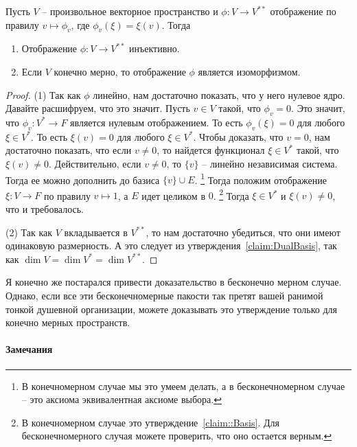 \begin{claim}
\label{claim::DoubleDuoIsom}
Пусть $V$ -- произвольное векторное пространство и $\phi\colon V\to V^{**}$ отображение по правилу $v\mapsto \phi_v$, где $\phi_v(\xi) = \xi(v)$.
Тогда 
\begin{enumerate}
\item Отображение $\phi\colon V\to V^{**}$ инъективно.

\item Если $V$ конечно мерно, то отображение $\phi$ является изоморфизмом.
\end{enumerate}
\end{claim}
\begin{proof}
(1) Так как $\phi$ линейно, нам достаточно показать, что у него нулевое ядро.
Давайте расшифруем, что это значит.
Пусть $v\in V$ такой, что $\phi_v = 0$.
Это значит, что $\phi_v \colon V^* \to F$ является нулевым отображением.
То есть $\phi_v(\xi) = 0$ для любого $\xi \in V^*$.
То есть $\xi(v) = 0$ для любого $\xi \in V^*$.
Чтобы доказать, что $v = 0$, нам достаточно показать, что если $v\neq0$, то найдется функционал $\xi \in V^*$ такой, что $\xi(v)\neq 0$.
Действительно, если $v\neq 0$, то $\{v\}$ -- линейно независимая система.
Тогда ее можно дополнить до базиса $\{v\}\cup E$.%
\footnote{В конечномерном случае мы это умеем делать, а в бесконечномерном случае -- это аксиома эквивалентная аксиоме выбора.}
Тогда положим отображение $\xi \colon V\to F$ по правилу $v\mapsto 1$, а $E$ идет целиком в $0$.%
\footnote{В конечномерном случае это утверждение~\ref{claim::Basis}.
Для бесконечномерного случая можете проверить, что оно остается верным.}
Тогда $\xi\in V^*$ и $\xi(v)\neq 0$, что и требовалось.

(2) Так как $V$ вкладывается в $V^{**}$, то нам достаточно убедиться, что они имеют одинаковую размерность.
А это следует из утверждения~\ref{claim:DualBasis}, так как $\dim V = \dim V^* = \dim V^{**}$.
\end{proof}

Я конечно же постарался привести доказательство в бесконечно мерном случае.
Однако, если все эти бесконечномерные пакости так претят вашей ранимой тонкой душевной организации, можете доказывать это утверждение только для конечно мерных пространств.

\paragraph{Замечания}

